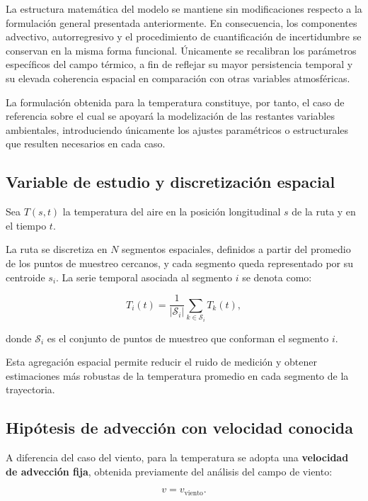 \documentclass[
  spanish,
  us-letterpaper,
]{scrreprt}
\numberwithin{equation}{section}
\begin{document}
La estructura matemática del modelo se mantiene sin modificaciones
respecto a la formulación general presentada anteriormente. En
consecuencia, los componentes advectivo, autorregresivo y el
procedimiento de cuantificación de incertidumbre se conservan en la
misma forma funcional. Únicamente se recalibran los parámetros
específicos del campo térmico, a fin de reflejar su mayor persistencia
temporal y su elevada coherencia espacial en comparación con otras
variables atmosféricas.

La formulación obtenida para la temperatura constituye, por tanto, el
caso de referencia sobre el cual se apoyará la modelización de las
restantes variables ambientales, introduciendo únicamente los ajustes
paramétricos o estructurales que resulten necesarios en cada caso.

\subsection{Variable de estudio y discretización
espacial}\label{variable-de-estudio-y-discretizaciuxf3n-espacial}

Sea \(T(s,t)\) la temperatura del aire en la posición longitudinal \(s\)
de la ruta y en el tiempo \(t\).

La ruta se discretiza en \(N\) segmentos espaciales, definidos a partir
del promedio de los puntos de muestreo cercanos, y cada segmento queda
representado por su centroide \(s_i\). La serie temporal asociada al
segmento \(i\) se denota como:

\[
T_i(t) = \frac{1}{|\mathcal{S}_i|} \sum_{k \in \mathcal{S}_i} T_k(t),
\]

donde \(\mathcal{S}_i\) es el conjunto de puntos de muestreo que
conforman el segmento \(i\).

Esta agregación espacial permite reducir el ruido de medición y obtener
estimaciones más robustas de la temperatura promedio en cada segmento de
la trayectoria.

\subsection{Hipótesis de advección con velocidad
conocida}\label{hipuxf3tesis-de-advecciuxf3n-con-velocidad-conocida}

A diferencia del caso del viento, para la temperatura se adopta una
\textbf{velocidad de advección fija}, obtenida previamente del análisis
del campo de viento:

\[
v = v_{\text{viento}}.
\]
\end{document}
